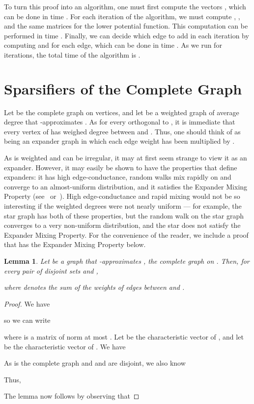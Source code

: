 \documentclass[12pt]{article}
\newtheorem{lemma}[theorem]{Lemma}
\begin{document}
To turn this proof into an algorithm, one must first compute the vectors ,
  which can be done in time .
For each iteration of the algorithm, we must compute 
  ,  ,
  and the same matrices for the lower potential function.
This computation can be performed in time .
Finally, we can decide which edge to add in each iteration by computing
   and  for each edge, which can be done
  in time .
As we run for  iterations, the total time of the algorithm is
  .


\section{Sparsifiers of the Complete Graph}\label{sec:expanders}
Let  be the complete graph on  vertices,
  and let  be a weighted graph of
  average degree  that -approximates
  .
As  for every  orthogonal
  to , it is immediate that every vertex of 
  has weighed degree between  and .
Thus, one should think of  as being an expander graph in which
  each edge weight has been multiplied by .

As  is weighted and can be irregular, it may at first seem
  strange to view it as an expander.
However, it may easily be shown to have the properties that define
   expanders: it has high edge-conductance,
  random walks mix rapidly on  and converge to an almost-uniform distribution,  and it satisfies the
  Expander Mixing Property (see~\cite{AlonChung} 
  or~\cite[Lemma 2.5]{ExpanderSurvey}).
High edge-conductance and rapid mixing would not be so interesting if
  the weighted degrees were not nearly uniform ---
for example, the star graph has both of these properties,
but the random walk on the star graph converges to a very non-uniform
  distribution, and the star does not satisfy the Expander Mixing Property.
For the convenience of the reader, we include a proof that 
  has the Expander Mixing Property below.
\begin{lemma}\label{lem:mixing}
Let  be a graph
  that -approximates ,
  the complete graph on .
Then, for every pair of disjoint sets  and ,

where  denotes the sum of the weights of edges
  between  and .
\end{lemma}
\begin{proof}
We have

so
  we can write 

  where  is a matrix of norm at most 
 .
Let  be the characteristic vector of , and let
   be the characteristic vector of .
We have

As  is the complete graph and  and  are disjoint, we also know

Thus,

The lemma now follows by observing that

\end{proof}
\end{document}
